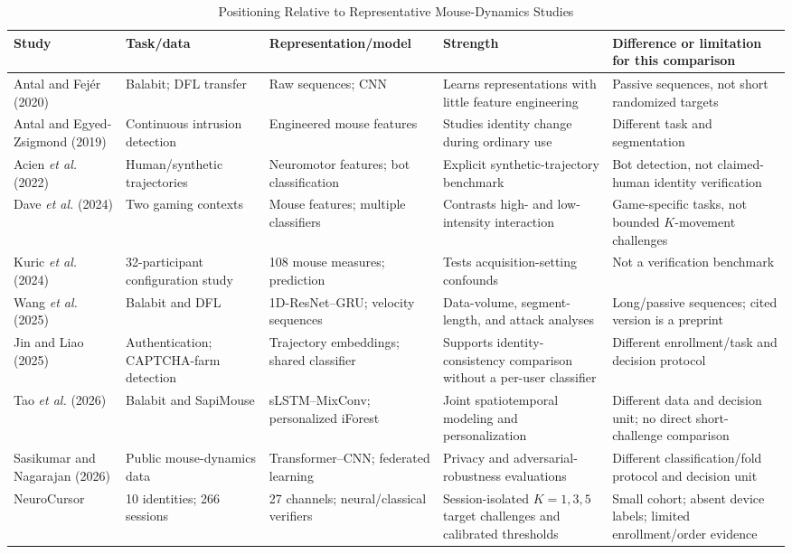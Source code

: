 \documentclass[conference]{IEEEtran}
\begin{document}
\begin{table}[t]
\centering
\small
\caption{Positioning Relative to Representative Mouse-Dynamics Studies}
\label{tab:related_work_positioning}
\begin{tabular}{@{}p{2.3cm}p{2.4cm}p{3.0cm}p{4.0cm}p{4.0cm}@{}}
\toprule
\textbf{Study} & \textbf{Task/data} & \textbf{Representation/model} &
\textbf{Strength} & \textbf{Difference or limitation for this comparison} \\
\midrule
Antal and Fej\'er (2020) \cite{antalFejer2020} &
Balabit; DFL transfer & Raw sequences; CNN &
Learns representations with little feature engineering &
Passive sequences, not short randomized targets \\
Antal and Egyed-Zsigmond (2019) \cite{antalEgyed2019} &
Continuous intrusion detection & Engineered mouse features &
Studies identity change during ordinary use &
Different task and segmentation \\
Acien \textit{et al.} (2022) \cite{acien2022BeCAPTCHA} &
Human/synthetic trajectories & Neuromotor features; bot classification &
Explicit synthetic-trajectory benchmark &
Bot detection, not claimed-human identity verification \\
Dave \textit{et al.} (2024) \cite{dave2024Clicks} &
Two gaming contexts & Mouse features; multiple classifiers &
Contrasts high- and low-intensity interaction &
Game-specific tasks, not bounded $K$-movement challenges \\
Kuric \textit{et al.} (2024) \cite{kuricMouseCredibility} &
32-participant configuration study & 108 mouse measures; prediction &
Tests acquisition-setting confounds &
Not a verification benchmark \\
Wang \textit{et al.} (2025) \cite{wang2025Mouse} &
Balabit and DFL & 1D-ResNet--GRU; velocity sequences &
Data-volume, segment-length, and attack analyses &
Long/passive sequences; cited version is a preprint \\
Jin and Liao (2025) \cite{jin2025Similarity} &
Authentication; CAPTCHA-farm detection & Trajectory embeddings; shared classifier &
Supports identity-consistency comparison without a per-user classifier &
Different enrollment/task and decision protocol \\
Tao \textit{et al.} (2026) \cite{tao2026Spatiotemporal} &
Balabit and SapiMouse & sLSTM--MixConv; personalized iForest &
Joint spatiotemporal modeling and personalization &
Different data and decision unit; no direct short-challenge comparison \\
Sasikumar and Nagarajan (2026) \cite{sasikumar2026Privacy} &
Public mouse-dynamics data & Transformer--CNN; federated learning &
Privacy and adversarial-robustness evaluations &
Different classification/fold protocol and decision unit \\
NeuroCursor &
10 identities; 266 sessions & 27 channels; neural/classical verifiers &
Session-isolated $K=1,3,5$ target challenges and calibrated thresholds &
Small cohort; absent device labels; limited enrollment/order evidence \\
\bottomrule
\end{tabular}
\end{table}
\end{document}
